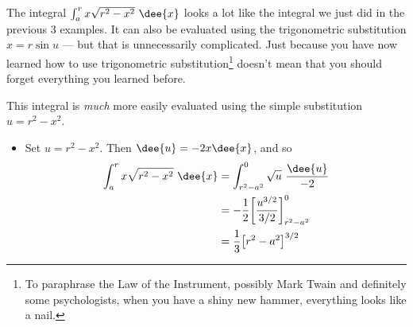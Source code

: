\begin{eg}\label{eg:INVTRIGaa}
The integral $\int_a^r x\sqrt{r^2-x^2}\ \dee{x}$ looks a lot like the integral
we just did in the previous 3 examples. It can also be evaluated
using the trigonometric substitution $x= r\sin u$ --- but that is unnecessarily
complicated. Just because you have now learned how to use trigonometric
substitution\footnote{To paraphrase the Law of the Instrument, possibly Mark Twain and
definitely some psychologists, when you have a shiny new hammer, everything looks like a
nail.} doesn't mean that you should forget everything you learned before.

\soln This integral is \emph{much} more easily
evaluated using the simple substitution $u=r^2-x^2$.
\begin{itemize}
 \item Set $u=r^2-x^2$. Then $\dee{u}=-2x\dee{x}$, and so
\begin{align*}
\int_a^r x\sqrt{r^2-x^2}\ \dee{x}
&=\int_{r^2-a^2}^0 \sqrt{u}\ \frac{\dee{u}}{-2} \\
&=-\frac{1}{2}\bigg[\frac{u^{3/2}}{3/2}\bigg]_{r^2-a^2}^0 \\
&=\frac{1}{3}\big[r^2-a^2\big]^{3/2}
\end{align*}
\end{itemize}
\end{eg}

